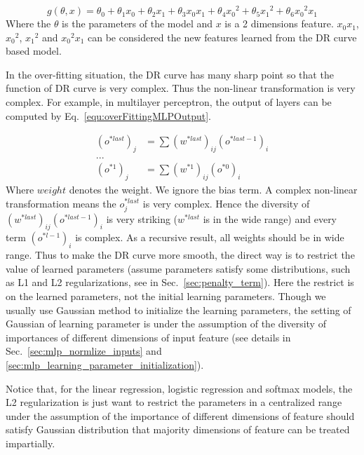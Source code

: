 \documentclass[runningheads,openany]{xhlPaper}
\begin{document}
\begin{equation}
\label{equ:overFittingDRFunctionHighOrder}
g\left( {\theta, x} \right) = {\theta_0} + {\theta_1}{x_0} + {\theta_2}{x_1} + {\theta_3}{x_0}{x_1} + {\theta_4}{x_0}^2 + {\theta_5}{x_1}^2 + {\theta_6}{x_0}^2{x_1}
\end{equation}
Where the $\theta$ is the parameters of the model and $x$ is a 2 dimensions feature. ${x_0}{x_1}$, ${x_0}^2$, ${x_1}^2$ and ${x_0}^2{x_1}$ can be considered the new features learned from the DR curve based model. 

In the over-fitting situation, the DR curve has many sharp point so that the function of DR curve is very complex. Thus the non-linear transformation is very complex. 
For example, in multilayer perceptron, the output of layers can be computed by Eq.~\ref{equ:overFittingMLPOutput}.

\begin{equation}
\label{equ:overFittingMLPOutput}
\begin{aligned}
{\left( {{o^{*last}}} \right)_j} &= \sum {{{\left( {{w^{*last}}} \right)}_{ij}}{{\left( {{o^{*last - 1}}} \right)}_i}} \\
...\\
{\left( {{o^{*1}}} \right)_j} &= \sum {{{\left( {{w^{*1}}} \right)}_{ij}}{{\left( {{o^{*0}}} \right)}_i}} 
\end{aligned}
\end{equation}
Where $weight$ denotes the weight. We ignore the bias term.
A complex non-linear transformation means the $o^{*last}_{j}$ is very complex. Hence the diversity of ${{{\left( {{w^{*last}}} \right)}_{ij}}{{\left( {{o^{*last - 1}}} \right)}_i}}$ is very striking ($w^{*last}$ is in the wide range) and every term ${{{\left( {{o^{*l - 1}}} \right)}_i}}$ is complex.
As a recursive result, all weights should be in wide range.
Thus to make the DR curve more smooth, the direct way is to restrict the value of learned parameters (assume parameters satisfy some distributions, such as L1 and L2 regularizations, see in Sec.~\ref{sec:penalty_term}). 
Here the restrict is on the learned parameters, not the initial learning parameters.
Though we usually use Gaussian method to initialize the learning parameters, the setting of Gaussian of learning parameter is under the assumption of the diversity of importances of different dimensions of input feature (see details in Sec.~\ref{sec:mlp_normlize_inputs} and \ref{sec:mlp_learning_parameter_initialization}).

Notice that, for the linear regression, logistic regression and softmax models, the L2 regularization is just want to restrict the parameters in a centralized range under the assumption of the importance of different dimensions of feature should satisfy Gaussian distribution that majority dimensions of feature can be treated impartially.
\end{document}
